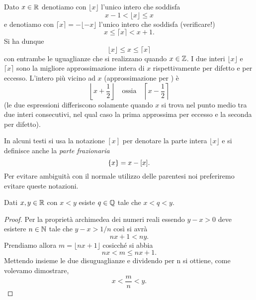 \begin{definition}
\mymark{**}
Dato $x\in \mathbb R$ denotiamo con $\lfloor x\rfloor$ l'unico intero
che soddisfa
\mynote{$\lfloor\cdot\rfloor$} %
\[
  x - 1 < \lfloor x \rfloor \le x
\]
e denotiamo con $\lceil x \rceil = - \lfloor -x \rfloor$ l'unico intero che soddisfa (verificare!)
\mynote{$\lceil\cdot\rceil$} %
\[
  x \le \lceil x \rceil < x + 1.
\]
Si ha dunque
\[
  \lfloor x \rfloor \le x \le \lceil x \rceil
\]
con entrambe le uguaglianze che si realizzano quando $x\in \mathbb Z$.
I due interi $\lfloor x \rfloor$ e $\lceil x \rceil$
sono la migliore approssimazione intera di $x$ rispettivamente
per difetto e per eccesso.
L'intero più vicino ad $x$ (approssimazione per )
è
\[
  \left\lfloor x + \frac 1 2 \right\rfloor
\quad \text{ossia} \quad
  \left\lceil x-\frac 1 2 \right\rceil
\]
(le due espressioni differiscono solamente quando $x$ si trova nel punto medio tra due interi consecutivi, nel qual caso la prima approssima per eccesso e la seconda per difetto).
\end{definition}
In alcuni testi si usa la notazione $[x]$ per denotare la parte intera $\lfloor x \rfloor$ e si definisce
anche la \emph{parte frazionaria}
\[
   {\left\{ x \right\}} = x - [x].
\]
Per evitare ambiguità con il normale utilizzo delle parentesi
noi preferiremo evitare queste notazioni.

\begin{theorem}[densità di $\QQ$ in $\RR$]
\label{th:densita_Q}%
\mymark{*}%
%
Dati $x,y \in \mathbb R$ con $x<y$ esiste $q\in \mathbb Q$ tale che $x<q<y$.
\end{theorem}
%
\begin{proof}
Per la proprietà archimedea dei numeri reali essendo $y-x>0$
deve esistere $n\in \mathbb N$ tale che $y-x > 1/n$ così si avrà
\[
    nx + 1 < ny.
\]
Prendiamo allora $m=\lfloor nx + 1\rfloor$ cosicché si abbia
\[
  nx < m \le nx + 1.
\]
Mettendo insieme le due disuguaglianze e dividendo per n si ottiene,
come volevamo dimostrare,
\[
 x < \frac{m}{n} < y.
\]
\end{proof}

